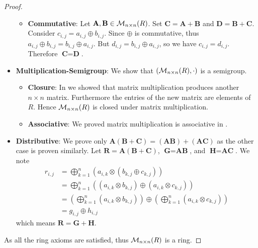 \begin{proof}
\begin{itemize}
\begin{itemize}
            \item \textbf{Commutative}: Let $\textbf{A}, \textbf{B} \in \mathcal{M}_{n\times n}(R)$. Set $\textbf{C} = \textbf{A} + \textbf{B}$ and $\textbf{D} = \textbf{B} + \textbf{C}$. Consider $c_{i,j} = a_{i,j} \oplus b_{i,j}$. Since $\oplus$ is commutative, thus $a_{i,j} \oplus b_{i,j} = b_{i,j} \oplus a_{i,j}$. But $d_{i,j} = b_{i,j} \oplus a_{i,j}$, so we have $c_{i,j} = d_{i,j}$. Therefore $\textbf{C} = \textbf{D}$.
        \end{itemize}

        \item \textbf{Multiplication-Semigroup}: We show that $(\mathcal{M}_{n\times n}(R), \cdot)$ is a semigroup.
        \begin{itemize}
            \item \textbf{Closure}: In  we showed that matrix multiplication produces another $n \times n$ matrix. Furthermore the entries of the new matrix are elements of $R$. Hence $\mathcal{M}_{n\times n}(R)$ is closed under matrix multiplication.
        
            \item \textbf{Associative}: We proved matrix multiplication is associative in .
        \end{itemize}
        
        \item \textbf{Distributive}: We prove only $\textbf{A}(\textbf{B} + \textbf{C}) = (\textbf{AB}) + (\textbf{AC})$ as the other case is proven similarly. Let $\textbf{R} = \textbf{A}(\textbf{B} + \textbf{C})$, $\textbf{G} = \textbf{AB}$, and $\textbf{H} = \textbf{AC}$. We note
        \begin{align*}
            r_{i,j} &= \bigoplus_{k=1}^n \left(a_{i,k} \otimes \left(b_{k,j} \oplus c_{k,j}\right)\right)\\
            &= \bigoplus_{k=1}^n \left((a_{i,k} \otimes b_{k,j}) \oplus (a_{i,k} \otimes c_{k,j})\right)\\
            &= \left(\bigoplus_{k=1}^n (a_{i,k} \otimes b_{k,j})\right) \oplus \left(\bigoplus_{k=1}^n (a_{i,k} \otimes c_{k,j})\right)\\
            &= g_{i,j}\oplus h_{i,j}
        \end{align*}
        which means $\textbf{R} = \textbf{G} + \textbf{H}$.
    \end{itemize}
    As all the ring axioms are satisfied, thus $\mathcal{M}_{n\times n}(R)$ is a ring.


\end{proof}
